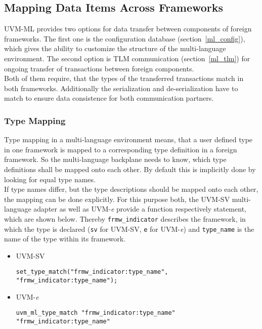 \subsection{Mapping Data Items Across Frameworks }\label{type_mapping}

UVM-ML provides two options for data transfer between components of foreign frameworks. The first one is the configuration
database (section~\ref{ml_config}), which gives the ability to customize the structure of the multi-language
environment. The second option is TLM communication (section~\ref{ml_tlm}) for ongoing transfer of transactions between foreign components.\\
Both of them require, that the types of the transferred transactions match in both frameworks. Additionally the
serialization and de-serialization have to match to ensure data consistence for both communication partners.

\subsubsection{Type Mapping}
Type mapping in a multi-language environment means, that a user defined type in
one framework is mapped to a corresponding type definition in a foreign framework. So the multi-language
backplane needs to know, which type definitions shall be mapped onto each other. By default this is implicitly done by
looking for equal type names.\\
If type names differ, but the type descriptions should be mapped onto each other, the mapping can be done explicitly.
For this purpose both, the UVM-SV multi-language adapter as well as UVM-\textit{e} provide a function respectively
statement, which are shown below. Thereby \lstinline$frmw_indicator$ describes the framework, in which the type is
declared (\lstinline$sv$ for UVM-SV, \lstinline$e$ for UVM-\textit{e}) and \lstinline$type_name$ is the name
of the type within its framework.
\begin{itemize}
  \item{UVM-SV}
\begin{lstlisting}
set_type_match("frmw_indicator:type_name", "frmw_indicator:type_name");
\end{lstlisting} 
  \item{UVM-\textit{e}}
\begin{lstlisting}
uvm_ml_type_match "frmw_indicator:type_name" "frmw_indicator:type_name"
\end{lstlisting} 
\end{itemize}

